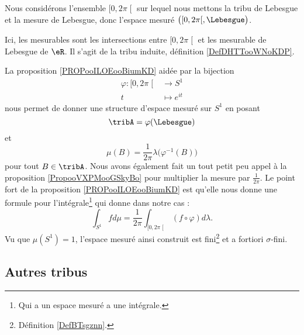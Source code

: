 \begin{normaltext}
    Nous considérons l'ensemble \( \mathopen[ 0 , 2\pi \mathclose[\) sur lequel nous mettons la tribu de Lebesgue et la mesure de Lebesgue, donc l'espace mesuré \( \big( \mathopen[ 0 , 2\pi \mathclose[, \Lebesgue\big)\). 

        Ici, les mesurables sont les intersections entre \( \mathopen[ 0 , 2\pi \mathclose[\) et les mesurable de Lebesgue de \( \eR\). Il s'agit de la tribu induite, définition \ref{DefDHTTooWNoKDP}.
        
        La proposition \ref{PROPooILOEooBiumKD} aidée par la bijection
        \begin{equation}
            \begin{aligned}
                \varphi\colon \mathopen[ 0 , 2\pi \mathclose[&\to S^1 \\
                    t&\mapsto  e^{it} 
            \end{aligned}
        \end{equation}
        nous permet de donner une structure d'espace mesuré sur \( S^1\) en posant
        \begin{equation}
            \tribA=\varphi(\Lebesgue)
        \end{equation}
        et
        \begin{equation}        \label{EQooOEVDooSYWrgT}
            \mu(B)=\frac{1}{ 2\pi }\lambda\big( \varphi^{-1}(B) \big)
        \end{equation}
        pour tout \( B\in \tribA\). Nous avons également fait un tout petit peu appel à la proposition \ref{PropooVXPMooGSkyBo} pour multiplier la mesure par \( \frac{1}{ 2\pi }\). Le point fort de la proposition \ref{PROPooILOEooBiumKD} est qu'elle nous donne une formule pour l'intégrale\footnote{Qui a un espace mesuré a une intégrale.} qui donne dans notre cas :
        \begin{equation}        \label{EQooCFPAooMcrDEQ}
            \int_{S^1}fd\mu=\frac{1}{ 2\pi }\int_{\mathopen[ 0 , 2\pi \mathclose[}(f\circ\varphi)d\lambda.            
        \end{equation}
    Vu que \( \mu(S^1)=1\), l'espace mesuré ainsi construit est fini\footnote{Définition \ref{DefBTsgznn}.} et a fortiori \( \sigma\)-fini.
\end{normaltext}

\subsection{Autres tribus}

